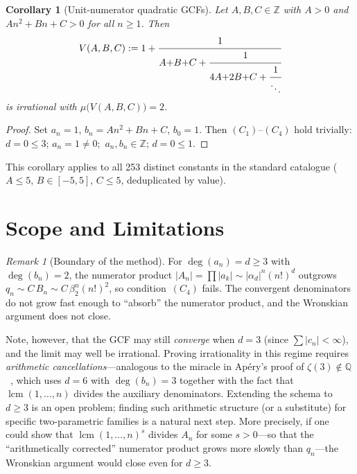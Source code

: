 \documentclass[11pt,a4paper]{article}
\newtheorem{corollary}[theorem]{Corollary}
\theoremstyle{definition}
\theoremstyle{remark}
\newtheorem{remark}[theorem]{Remark}
\DeclareMathOperator{\lcm}{lcm}
\newcommand{\abs}[1]{\lvert #1 \rvert}
\begin{document}
\begin{corollary}[Unit-numerator quadratic GCFs]\label{cor:unit}
Let $A, B, C \in \mathbb{Z}$ with $A > 0$ and $An^2 + Bn + C > 0$
for all $n \geq 1$.  Then
\[
  V(A,B,C) := 1 + \cfrac{1}{A{+}B{+}C + \cfrac{1}{4A{+}2B{+}C + \cfrac{1}{\ddots}}}
\]
is irrational with $\mu\bigl(V(A,B,C)\bigr) = 2$.
\end{corollary}

\begin{proof}
Set $a_n = 1$, $b_n = An^2 + Bn + C$, $b_0 = 1$.
Then $(C_1)$--$(C_4)$ hold trivially:
$d = 0 \leq 3$; $a_n = 1 \neq 0$;\ $a_n, b_n \in \mathbb{Z}$;
$d = 0 \leq 1$.
\end{proof}

This corollary applies to all 253 distinct constants in the standard
catalogue ($A \leq 5$, $B \in [-5,5]$, $C \leq 5$, deduplicated by value).


\section{Scope and Limitations}\label{sec:scope}

\begin{remark}[Boundary of the method]\label{rem:boundary}
For $\deg(a_n) = d \geq 3$ with $\deg(b_n) = 2$, the numerator product
$\abs{A_n} = \prod\abs{a_k} \sim \abs{\alpha_d}^n (n!)^d$ outgrows
$q_n \sim C\, B_n \sim C\, \beta_2^n (n!)^2$, so condition~$(C_4)$ fails.
The convergent denominators do not grow fast enough to ``absorb'' the
numerator product, and the Wronskian argument does not close.

Note, however, that the GCF may still \emph{converge} when $d = 3$
(since $\sum\abs{c_n} < \infty$), and the limit may well be irrational.
Proving irrationality in this regime requires \emph{arithmetic
cancellations}---analogous to the miracle in Ap\'ery's proof of
$\zeta(3) \notin \mathbb{Q}$~\cite{apery1979,beukers1979}, which uses
$d = 6$ with $\deg(b_n) = 3$ together with the fact that
$\lcm(1,\ldots,n)$ divides the auxiliary denominators.
Extending the schema to $d \geq 3$ is an open problem;
finding such arithmetic structure (or a substitute) for specific
two-parametric families is a natural next step.
More precisely, if one could show that $\lcm(1,\ldots,n)^s$
divides $A_n$ for some $s > 0$---so that the ``arithmetically corrected''
numerator product grows more slowly than $q_n$---the Wronskian argument
would close even for $d \geq 3$.
\end{remark}
\end{document}
